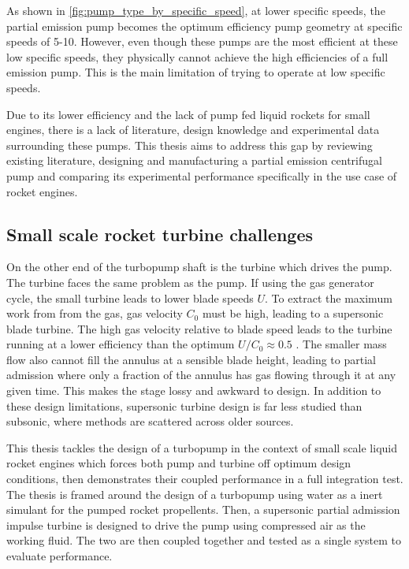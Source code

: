 As shown in \cref{fig:pump_type_by_specific_speed}, at lower specific speeds, the partial emission pump becomes the optimum efficiency pump geometry at specific speeds of  5-10. However, even though these pumps are the most efficient at these low specific speeds, they physically cannot achieve the high efficiencies of a full emission pump. This is the main limitation of trying to operate at low specific speeds.  

Due to its lower efficiency and the lack of pump fed liquid rockets for small engines, there is a lack of literature, design knowledge and experimental data surrounding these pumps. This thesis aims to address this gap by reviewing existing literature, designing and manufacturing a partial emission centrifugal pump and comparing its experimental performance specifically in the use case of rocket engines.

\subsection{Small scale rocket turbine challenges}

On the other end of the turbopump shaft is the turbine which drives the pump. The turbine faces the same problem as the pump. If using the gas generator cycle, the small turbine leads to lower blade speeds $U$. To extract the maximum work from from the gas, gas velocity $C_0$ must be high, leading to a supersonic blade turbine. The high gas velocity relative to blade speed leads to the turbine running at a lower efficiency than the optimum $U/C_0 \approx 0.5$ \cite{findsource}. The smaller mass flow also cannot fill the annulus at a sensible blade height, leading to partial admission where only a fraction of the annulus has gas flowing through it at any given time. This makes the stage lossy and awkward to design. In addition to these design limitations, supersonic turbine design is far less studied than subsonic, where methods are scattered across older sources. 

This thesis tackles the design of a turbopump in the context of small scale liquid rocket engines which forces both pump and turbine off optimum design conditions, then demonstrates their coupled performance in a full integration test. The thesis is framed around the design of a \valPumpRpmDesign turbopump using water as a inert simulant for the pumped rocket propellents. Then, a supersonic partial admission impulse turbine is designed to drive the pump using compressed air as the working fluid. The two are then coupled together and tested as a single system to evaluate performance.

